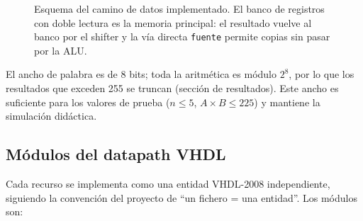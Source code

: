 \documentclass[llncs]{llncs}
\begin{document}
\begin{figure}[t]
  \centering
  \caption{Esquema del camino de datos implementado. El banco de registros
  con doble lectura es la memoria principal: el resultado vuelve al banco
  por el shifter y la vía directa \texttt{fuente} permite copias sin pasar
  por la ALU.}
  \label{fig:esquema}
\end{figure}

El ancho de palabra es de 8 bits; toda la aritmética es módulo $2^8$, por lo
que los resultados que exceden 255 se truncan (sección de
resultados). Este ancho es suficiente para los valores de prueba ($n\le5$,
$A\times B\le225$) y mantiene la simulación didáctica.

\subsection{Módulos del datapath VHDL}

Cada recurso se implementa como una entidad VHDL-2008 independiente, siguiendo
la convención del proyecto de ``un fichero = una entidad''. Los módulos son:
\end{document}
